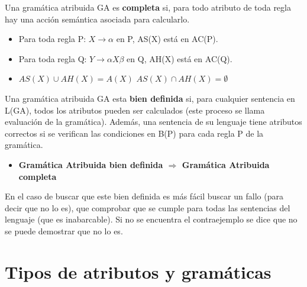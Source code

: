 \documentclass[12pt]{report} %
\begin{document}
Una gramática atribuida GA es \textbf{completa} si, para todo atributo de toda regla hay una acción semántica asociada para calcularlo.
\begin{itemize}
  \item Para toda regla P: $X\rightarrow\alpha$ en P, AS(X) está en AC(P).
  \item Para toda regla Q: $Y\rightarrow\alpha X \beta$ en Q, AH(X) está en AC(Q).
  \item $AS(X) \cup AH(X) = A(X)$ $AS(X) \cap AH(X)=\emptyset$
\end{itemize}

Una gramática atribuida GA esta \textbf{bien definida} si, para cualquier sentencia en L(GA), todos los atributos pueden ser calculados (este proceso se llama evaluación de la gramática). Además, una sentencia de su lenguaje tiene atributos correctos si se verifican las condiciones en B(P) para cada regla P de la gramática.
\begin{itemize}
  \item \textbf{Gramática Atribuida bien definida $\Rightarrow$ Gramática Atribuida completa}
\end{itemize}
En el caso de buscar que este bien definida es más fácil buscar un fallo (para decir que no lo es), que comprobar que se cumple para todas las sentencias del lenguaje (que es inabarcable). Si no se encuentra el contraejemplo se dice que no se puede demostrar que no lo es.

\section{Tipos de atributos y gramáticas}
\end{document}
